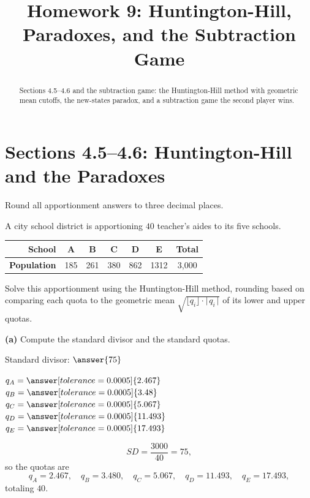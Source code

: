 \documentclass[12pt]{ximera}
\title{Homework 9: Huntington-Hill, Paradoxes, and the Subtraction Game}
\begin{document}
\begin{abstract}
Sections 4.5--4.6 and the subtraction game: the Huntington-Hill method with geometric
mean cutoffs, the new-states paradox, and a subtraction game the second player wins.
\end{abstract}
\maketitle

\section*{Sections 4.5--4.6: Huntington-Hill and the Paradoxes}

Round all apportionment answers to three decimal places.

\begin{problem}
A city school district is apportioning $40$ teacher's aides to its five schools.

\begin{center}
\begin{tabular}{|r|c|c|c|c|c|c|}\hline
\textbf{School} & A & B & C & D & E & \textbf{Total} \\\hline
\textbf{Population} & 185 & 261 & 380 & 862 & 1312 & 3{,}000 \\\hline
\end{tabular}
\end{center}

Solve this apportionment using the Huntington-Hill method, rounding based on comparing
each quota to the geometric mean $\sqrt{\lfloor q_i\rfloor \cdot \lceil q_i\rceil}$ of
its lower and upper quotas.

\begin{prompt}
\textbf{(a)} Compute the standard divisor and the standard quotas.

Standard divisor: $\answer{75}$

\smallskip
$q_A = \answer[tolerance=0.0005]{2.467}$ \quad
$q_B = \answer[tolerance=0.0005]{3.48}$ \quad
$q_C = \answer[tolerance=0.0005]{5.067}$ \quad
$q_D = \answer[tolerance=0.0005]{11.493}$ \quad
$q_E = \answer[tolerance=0.0005]{17.493}$

\begin{feedback}
\[ SD = \frac{3000}{40} = 75, \]
so the quotas are
\[
q_A = 2.467,\quad q_B = 3.480,\quad q_C = 5.067,\quad q_D = 11.493,\quad q_E = 17.493,
\]
totaling $40$. \checkmark
\end{feedback}
\end{prompt}


\end{problem}
\end{document}

